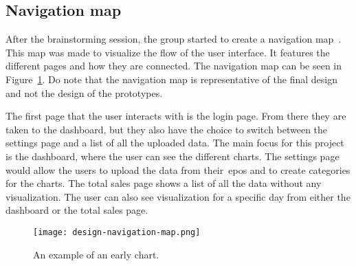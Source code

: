 \subsection{Navigation map}\label{subsec:navigation-map}

After the brainstorming session, the group started to create a navigation map~\cite{benyon2019}.
This map was made to visualize the flow of the user interface.
It features the different pages and how they are connected.
The navigation map can be seen in Figure~\ref{fig:navigation-map}.
Do note that the navigation map is representative of the final design and not the design of the prototypes.

The first page that the user interacts with is the login page.
From there they are taken to the dashboard, but they also have the choice to switch between the settings page and a list
of all the uploaded data.
The main focus for this project is the dashboard, where the user can see the different charts.
The settings page would allow the users to upload the data from their~\acrshort{epos} and to create categories for the
charts.
The total sales page shows a list of all the data without any visualization.
The user can also see visualization for a specific day from either the dashboard or the total sales page.

\begin{figure}[H]
    \centering
    \texttt{[image: design-navigation-map.png]}
    \caption{An example of an early chart.
    }\label{fig:navigation-map}
\end{figure}
